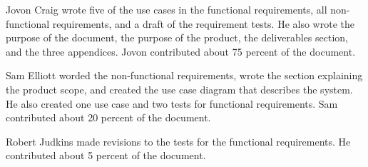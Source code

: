 \documentclass{article}
\begin{document}
Jovon Craig wrote five of the use cases in the functional requirements, all non-functional requirements, and a draft of the requirement tests. He also wrote the purpose of the document, the purpose of the product, the deliverables section, and the three appendices. Jovon contributed about 75 percent of the document.

Sam Elliott worded the non-functional requirements, wrote the section explaining the product scope, and created the use case diagram that describes the system.  He also created one use case and two tests for functional requirements.   Sam contributed about 20 percent of the document.

Robert Judkins made revisions to the tests for the functional requirements. He contributed about 5 percent of the document.
\end{document}
